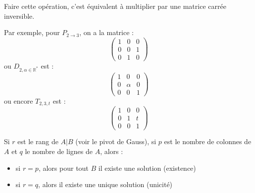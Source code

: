 \documentclass[a4paper, titlepage]{article}
\begin{document}
	Faire cette opération, c'est équivalent à multiplier par une matrice carrée inversible.

	Par exemple, pour $P_{2\to 3}$, on a la matrice :
	$$ \begin{pmatrix} 1&0&0\\0&0&1\\0&1&0 \end{pmatrix}  $$
	ou $D_{2, \alpha\in\mathbb{R}^*}$ est :
	$$ \begin{pmatrix} 1&0&0\\0&\alpha&0\\0&0&1 \end{pmatrix}  $$
	ou encore $T_{2,3,t}$ est :
	$$ \begin{pmatrix} 1&0&0\\0&1&t\\0&0&1 \end{pmatrix}  $$
	\begin{thm}
		Si $r$ est le rang de $A|B$ (voir le pivot de Gauss), si $p$ est le nombre de colonnes de $A$ et $q$ le nombre de lignes de $A$, alors :
		\begin{itemize}
			\item si $r=p$, alors pour tout $B$ il existe une solution (existence)
			\item si $r=q$, alors il existe une unique solution (unicité)
		\end{itemize}
	\end{thm}
\end{document}
